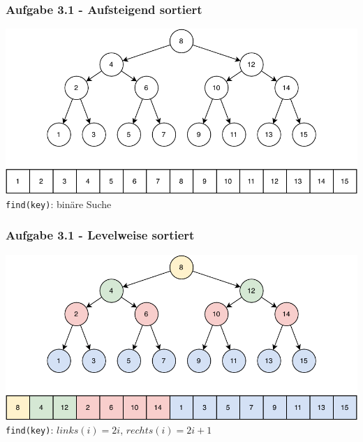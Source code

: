 \documentclass[aspectratio=169]{beamer}
\begin{document}
\begin{frame}
	\frametitle{Aufgabe 3.1 - Aufsteigend sortiert}
	
	
	\begin{center}
		\includegraphics[scale=.8]{sorted_layout.pdf}\\
		\centering \texttt{find(key)}: binäre Suche	
	\end{center}
	\end{frame}


\begin{frame}
	\frametitle{Aufgabe 3.1 - Levelweise sortiert}
	
	
	\begin{center}
		\includegraphics[scale=.8]{level_layout.pdf}\\
		\centering \texttt{find(key)}: $links(i) = 2i$, $rechts(i) = 2i+1$	
	\end{center}
	\end{frame}
\end{document}
